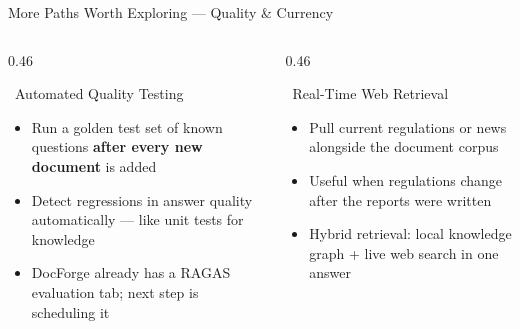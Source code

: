 \documentclass[aspectratio=169,11pt]{beamer}
\begin{document}
\begin{frame}{More Paths Worth Exploring — Quality \& Currency}
  \vspace{0.2cm}
  \begin{columns}[t]
    \begin{column}{0.46\textwidth}
      \begin{block}{\faChartBar\ Automated Quality Testing}
        \begin{itemize}\setlength\itemsep{8pt}
          \item Run a golden test set of known questions
                \textbf{after every new document} is added
          \item Detect regressions in answer quality
                automatically — like unit tests for knowledge
          \item DocForge already has a RAGAS evaluation
                tab; next step is scheduling it
        \end{itemize}
      \end{block}
    \end{column}
    \begin{column}{0.46\textwidth}
      \begin{block}{\faGlobe\ Real-Time Web Retrieval}
        \begin{itemize}\setlength\itemsep{8pt}
          \item Pull current regulations or news
                alongside the document corpus
          \item Useful when regulations change
                after the reports were written
          \item Hybrid retrieval: local knowledge graph
                + live web search in one answer
        \end{itemize}
      \end{block}
    \end{column}
  \end{columns}
\end{frame}
\end{document}
